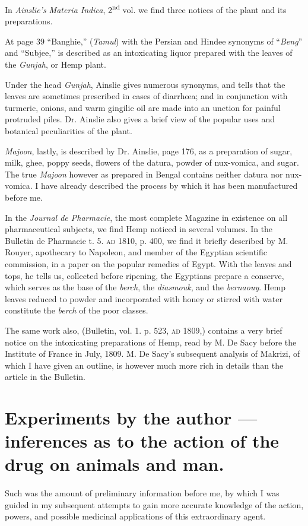 \documentclass[a4paper, 11pt, oneside, polutonikogreek, english]{article}
\begin{document}
In \emph{Ainslie's Materia Indica}, 2\textsuperscript{nd} vol. we find three notices of the plant and its preparations.

At page 39 ``Banghie,'' (\emph{Tamul}) with the Persian and Hindee synonyms of ``\emph{Beng}'' and ``Subjee,'' is described as an intoxicating liquor prepared with the leaves of the \emph{Gunjah}, or Hemp plant.

Under the head \emph{Gunjah}, Ainslie gives numerous synonyms, and tells that the leaves are sometimes prescribed in cases of diarrhœa; and in conjunction with turmeric, onions, and warm gingilie oil are made into an unction for painful protruded piles. Dr. Ainslie also gives a brief view of the popular uses and botanical peculiarities of the plant.

\emph{Majoon}, lastly, is described by Dr. Ainslie, page 176, as a preparation of sugar, milk, ghee, poppy seeds, flowers of the datura, powder of nux-vomica, and sugar. The true \emph{Majoon} however as prepared in Bengal contains neither datura nor nux-vomica. I have already described the process by which it has been manufactured before me.

In the \emph{Journal de Pharmacie}, the most complete Magazine in existence on all pharmaceutical subjects, we find Hemp noticed in several volumes. In the Bulletin de Pharmacie t. 5. \textsc{ad} 1810, p. 400, we find it briefly described by M. Rouyer, apothecary to Napoleon, and member of the Egyptian scientific commission, in a paper on the popular remedies of Egypt. With the leaves and tops, he tells us, collected before ripening, the Egyptians prepare a conserve, which serves as the base of the \emph{berch}, the \emph{diasmouk}, and the \emph{bernaouy}. Hemp leaves reduced to powder and incorporated with honey or stirred with water constitute the \emph{berch} of the poor classes.

The same work also, (Bulletin, vol. 1. p. 523, \textsc{ad} 1809,) contains a very brief notice on the intoxicating preparations of Hemp, read by M. De Sacy before the Institute of France in July, 1809. M. De Sacy's subsequent analysis of Makrizi, of which I have given an outline, is however much more rich in details than the article in the Bulletin.
\clearpage
\section{Experiments by the author --- inferences as to the action of the drug on animals and man.}
\paragraph{}
Such was the amount of preliminary information before me, by which I was guided in my subsequent attempts to gain more accurate knowledge of the action, powers, and possible medicinal applications of this extraordinary agent.
\end{document}
